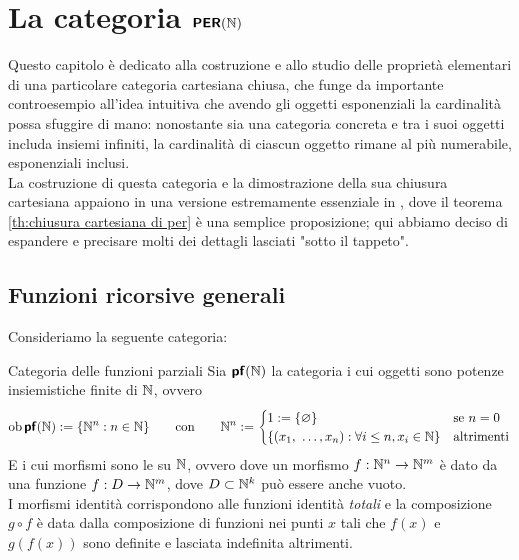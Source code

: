 \documentclass[openany]{book}
\begin{document}
\newcommand\percat{\catname{PER}}
\newcommand\pf{\catname{pf}}
\newcommand\grf{\catname{grf}}
\newcommand\prf{\catname{prf}}

\chapter{La categoria $\percat(\N)$}

Questo capitolo è dedicato alla costruzione e allo studio delle proprietà elementari di una particolare categoria cartesiana chiusa, che funge da importante controesempio all'idea intuitiva che avendo gli oggetti esponenziali la cardinalità possa sfuggire di mano: nonostante sia una categoria concreta e tra i suoi oggetti includa insiemi infiniti, la cardinalità di ciascun oggetto rimane al più numerabile, esponenziali inclusi.\\
La costruzione di questa categoria e la dimostrazione della sua chiusura cartesiana appaiono in una versione estremamente essenziale in \cite{Bainbridge1990}, dove il teorema \cref{th:chiusura cartesiana di per} è una semplice proposizione; qui abbiamo deciso di espandere e precisare molti dei dettagli lasciati "sotto il tappeto".

\section{Funzioni ricorsive generali}

Consideriamo la seguente categoria:

\begin{definition}{Categoria delle funzioni parziali}{}
    Sia $\pf(\N)$ la categoria i cui oggetti sono potenze insiemistiche finite di $\mathbb{N}$, ovvero 
    \[\ob\pf(\N) := \{ \N^n : n\in\N  \} \qquad\text{con}\qquad \N^n := \begin{cases}
    1 := \{\varnothing\} & \text{se } n = 0\\
    \{ (x_1,\ \dots, x_n) : \forall i\le n, x_i \in \N \} & \text{altrimenti}
    \end{cases} \]
    E i cui morfismi sono le  su $\mathbb{N}$, ovvero dove un morfismo $f:\mathbb{N}^n\to \mathbb{N}^m$ è dato da una funzione $f: D\to\mathbb{N}^m$, dove $D\subset \mathbb{N}^k$ può essere anche vuoto.\\
    I morfismi identità corrispondono alle funzioni identità \textit{totali} e la composizione $g\circ f$ è data dalla composizione di funzioni nei punti $x$ tali che $f(x)$ e $g(f(x))$ sono definite e lasciata indefinita altrimenti.
\end{definition}
\end{document}
